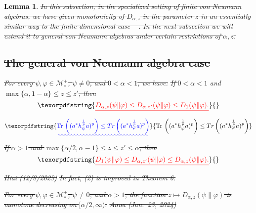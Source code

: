 \documentclass[12pt]{article}
\newtheorem{theorem}{Theorem}[section]
\newtheorem{lemma}[theorem]{Lemma}
\theoremstyle{definition}
\theoremstyle{remark}
\def\Me{\mathcal M}
\def \Tr{\mathrm{Tr}\,}
\def\ffi{\varphi}
\providecommand{\DIFaddtex}[1]{{\protect\color{blue}\uwave{#1}}} %
\providecommand{\DIFdeltex}[1]{{\protect\color{red}\sout{#1}}}                      %
\providecommand{\DIFaddbegin}{} %
\providecommand{\DIFaddend}{} %
\providecommand{\DIFdelbegin}{} %
\providecommand{\DIFdelend}{} %
\providecommand{\DIFadd}[1]{\texorpdfstring{\DIFaddtex{#1}}{#1}} %
\providecommand{\DIFdel}[1]{\texorpdfstring{\DIFdeltex{#1}}{}} %
\begin{document}
\begin{lemma}
\DIFdel{In this subsection, in the specialized setting of finite von Neumann algebras, we have given monotonicity
of $D_{\alpha,z}$ in the parameter $z$ in an essentially similar way to the finite-dimensional case
\mbox{%
\cite{mosonyi2023somecontinuity}}\hskip0pt%
. In the next subsection we will extend it to general von Neumann algebras
under certain restrictions of $\alpha,z$.
}%

\subsection{\DIFdel{The general von Neumann algebra case}}
\addtocounter{subsection}{-1}%

\DIFdel{For every $\psi,\ffi\in\Me_*^+$, $\psi\ne0$, and $0<\alpha<1$, we have:
}%
\DIFdel{If $0<\alpha<1$ }\DIFdelend \DIFaddbegin \DIFadd{$a\in \Me$ }\DIFaddend and \DIFdelbegin \DIFdel{$\max\{\alpha,1-\alpha\}\le z\le z'$, then
}\[
\DIFdel{D_{\alpha,z}(\psi\|\ffi)\le D_{\alpha,z'}(\psi\|\ffi)\le D_1(\psi\|\ffi).
}\]%
\DIFdelend \DIFaddbegin \DIFadd{$p\in [1,\infty)$,
}\[
\DIFadd{\Tr\left( (a^*h_\psi^{\frac{1}p}a)^p\right)\le Tr\left( (a^*h_\varphi^{\frac{1}p}a)^p\right)
}\]\DIFaddend 
\DIFdelbegin %
\DIFdel{If $\alpha>1$ and $\max\{\alpha/2,\alpha-1\}\le z\le z'\le\alpha$, then
}\[
\DIFdel{D_1(\psi\|\ffi)\le D_{\alpha,z'}(\psi\|\ffi)\le D_{\alpha,z}(\psi\|\ffi).
}\]%
\DIFdel{Hiai (12/8/2023)}%
\DIFdel{In fact, (2) is improved in Theorem 6.}%
\DIFdelend 


\DIFdelbegin %
\DIFdel{For every $\psi,\ffi\in\Me_*^+$, $\psi\ne0$, and
$\alpha>1$, the function $z\mapsto D_{\alpha,z}(\psi\|\varphi)$
is monotone decreasing on $[\alpha/2,\infty)$.
}%
\DIFdel{Anna (Jan.\ 23, 2024) }%
\DIFdelend \DIFaddbegin \end{lemma}
\DIFaddend 
\end{document}

